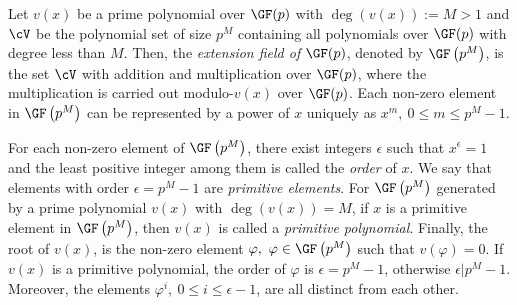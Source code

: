 Let $v(x)$ be a prime polynomial over $\GF(p)$ with $\deg(v(x)):=M>1$ and $\cV$ be the polynomial set of size $p^M$ containing all polynomials over $\GF(p)$ with degree less than $M$. Then, the \textit{extension field of $\GF(p)$}, denoted by $\GF\left(p^M\right)$, is the set $\cV$ with addition and multiplication over $\GF(p)$, where the multiplication is carried out modulo-$v(x)$ over $\GF(p)$.
Each non-zero element in $\GF \left(p^M\right)$ can be represented by a power of $x$ uniquely as $x^m,~0 \leq m \leq p^M-1$. %

For each non-zero element of $\GF \left(p^M\right)$, there exist integers $\epsilon$ such that $x^{\epsilon}=1$ and the least positive integer among them is called the \textit{order} of $x$. We say that elements with order $\epsilon=p^M-1$ are \textit{primitive elements}. For $\GF \left(p^M\right)$ generated by a prime polynomial $v(x)$ with $\deg(v(x))=M$, if $x$ is a primitive element in $\GF \left(p^M\right)$, then  $v(x)$ is called a \textit{primitive polynomial}. 
%
Finally, the root of $v(x)$, is the non-zero element $\varphi,~\varphi \in \GF \left(p^M\right)$ such that $v(\varphi)=0$. If $v(x)$ is a primitive polynomial, the order of $\varphi$ is $\epsilon=p^M-1$, otherwise $\epsilon | p^M-1$. 
Moreover, the elements $\varphi^i,~0 \leq i \leq \epsilon -1$, are all distinct from each other.
 

